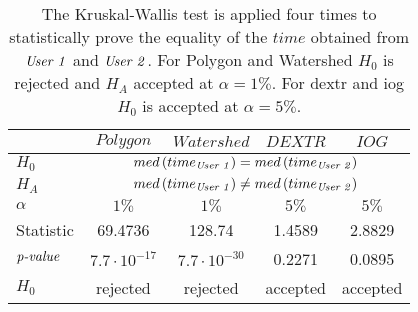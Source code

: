 \begin{table}[h!]
	\centering
	\begin{tabular}{l|c c c c}
		\toprule 		
							& $ Polygon $			&  $ Watershed $  		&  $ DEXTR $ 	& $ IOG $ 	\\
		\midrule
		$ H_{0} $			& \multicolumn{4}{c}{$ med \left( time_{\textnormal{\textit{User 1}}} \right) = med \left( time_{\textnormal{\textit{User 2}}} \right) $ }  \\  
		$ H_{A} $		 	& \multicolumn{4}{c}{$ med \left( time_{\textnormal{\textit{User 1}}} \right) \not= med \left( time_{\textnormal{\textit{User 2}}} \right) $}  \\ 	
		$ \alpha $		 	& $ 1\% $ 				&  $ 1\% $ 				&  $ 5\% $ 		& $ 5\% $	\\ 	
		Statistic		 	&  69.4736				&  128.74 				&  1.4589		& 2.8829	\\ 
		$ \textnormal{\textit{p-value}} $
							& $ 7.7 \cdot 10^{-17} $	& $ 7.7 \cdot 10^{-30} $	& 0.2271		& 0.0895 	\\
		$ H_{0} $		  	&  rejected 			&  rejected	  			&  accepted 	& accepted  \\ 										
		\bottomrule
	\end{tabular}
	\caption[Kruskal-Wallis on $ time $ from two users]{
		The Kruskal-Wallis test is applied four times to statistically prove the equality of the $ time $ obtained from $ \textnormal{\textit{User 1}} $ and $ \textnormal{\textit{User 2}} $.
		For Polygon and Watershed $ H_{0} $ is rejected and $ H_{A} $ accepted at $ \alpha = 1\% $.	
		For \gls{dextr} and \gls{iog} $ H_{0} $ is accepted at $ \alpha = 5\% $.	
	}\label{tab:appendix:afe_cmo_kruskal_wallis_time}
\end{table}
